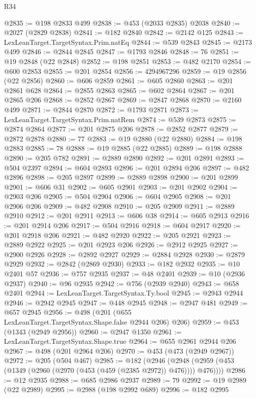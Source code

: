 \begin{lexlean}{R34}
\begin{coremodule}
@2835 := @198 @2833 @499
@2838 := @453 (@2033 @2835) @2038
@2840 := @2027 (@2829 @2838)
@2841 := @182 @2840
@2842 := @2142 @125
@2843 := LexLeanTarget.TargetSyntax.Prim.natEq
@2844 := @539 @2843
@2845 := @2173 @499
@2846 := @2844 @2845
@2847 := @1793 @2846
@2848 := 76
@2851 := @19 @2848 (@22 @2848)
@2852 := @198 @2851
@2853 := @482 @2170
@2854 := @600 @2853
@2855 := @201 @2854
@2856 := 4294967296
@2859 := @19 @2856 (@22 @2856)
@2860 := @606 @2859
@2861 := @605 @2860
@2863 := @201 @2861 @628
@2864 := @2855 @2863
@2865 := @602 @2864
@2867 := @201 @2865 @206
@2868 := @2852 @2867
@2869 := @2847 @2868
@2870 := @2160 @499
@2871 := @2844 @2870
@2872 := @1793 @2871
@2873 := LexLeanTarget.TargetSyntax.Prim.natRem
@2874 := @539 @2873
@2875 := @2874 @2864
@2877 := @201 @2875 @206
@2878 := @2852 @2877
@2879 := @2872 @2878
@2880 := 77
@2883 := @19 @2880 (@22 @2880)
@2884 := @198 @2883
@2885 := 78
@2888 := @19 @2885 (@22 @2885)
@2889 := @198 @2888
@2890 := @205 @782
@2891 := @2889 @2890
@2892 := @201 @2891
@2893 := @504 @2397
@2894 := @604 @2893
@2896 := @201 @2894 @206
@2897 := @482 @2896
@2898 := @205 @2897
@2899 := @2889 @2898
@2900 := @201 @2899
@2901 := @606 @31
@2902 := @605 @2901
@2903 := @201 @2902
@2904 := @2903 @206
@2905 := @504 @2904
@2906 := @604 @2905
@2908 := @201 @2906 @206
@2909 := @482 @2908
@2910 := @205 @2909
@2911 := @2889 @2910
@2912 := @201 @2911
@2913 := @606 @38
@2914 := @605 @2913
@2916 := @201 @2914 @206
@2917 := @504 @2916
@2918 := @604 @2917
@2920 := @201 @2918 @206
@2921 := @482 @2920
@2922 := @205 @2921
@2923 := @2889 @2922
@2925 := @201 @2923 @206
@2926 := @2912 @2925
@2927 := @2900 @2926
@2928 := @2892 @2927
@2929 := @2884 @2928
@2930 := @2879 @2929
@2932 := @2842 (@2869 @2930)
@2933 := @182 @2932
@2935 := @10 @2401 @57
@2936 := @757 @2935
@2937 := @48 @2401
@2939 := @10 (@2936 @2937)
@2940 := @96 @2935
@2942 := @756 (@2939 @2940)
@2943 := @658 @2401
@2944 := LexLeanTarget.TargetSyntax.Ty.bool
@2945 := @2943 @2944
@2946 := @2942 @2945
@2947 := @448 @2945
@2948 := @2947 @481
@2949 := @657 @2945
@2956 := @498 (@201 (@655 LexLeanTarget.TargetSyntax.Shape.false @2944 @206) @206)
@2959 := @453 (@1343 (@2949 @2956))
@2960 := @2947 @1350
@2961 := LexLeanTarget.TargetSyntax.Shape.true
@2964 := @655 @2961 @2944 @206
@2967 := @498 (@201 @2964 @206)
@2970 := @453 (@473 (@2949 @2967))
@2972 := @205 (@504 @467)
@2985 := @182
    (@2946 (@2948 (@2959 (@453 (@1349 (@2960 (@2970 (@453 (@459 (@2385 @2972)) @476)))) @476))))
@2986 := @12 @2935
@2988 := @685 @2986 @2937
@2989 := 79
@2992 := @19 @2989 (@22 @2989)
@2995 := @2988 (@198 @2992 @689)
@2996 := @182 @2995

\end{coremodule}
\end{lexlean}
